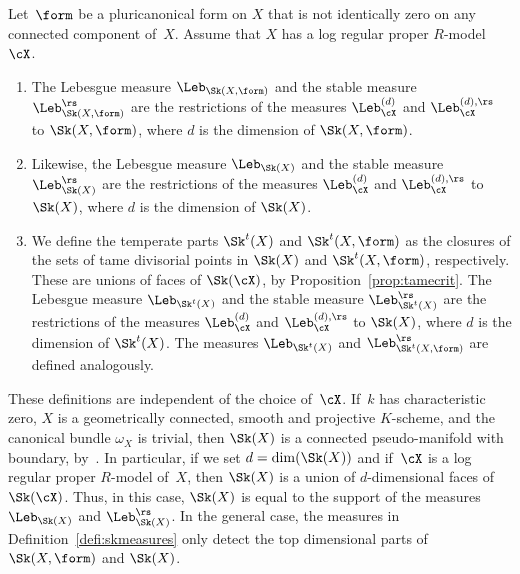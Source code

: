 \begin{definition}\label{defi:skmeasures}
Let~$\form$ be a pluricanonical form on $X$ that is not identically zero on any connected component of~$X$.
Assume that $X$ has a log regular proper $R$\nobreakdash-model~$\cX$.

\begin{enumerate}
\item The Lebesgue measure $\Leb_{\Sk(X,\form)}$ and the stable measure $\Leb^{\rs}_{\Sk(X,\form)}$ are
the restrictions of the measures $\Leb_{\cX}^{(d)}$ and $\Leb^{(d),\rs}_{\cX}$ to $\Sk(X,\form)$, where $d$ is the dimension of $\Sk(X,\form)$.

\item
Likewise, the Lebesgue measure $\Leb_{\Sk(X)}$ and the stable measure $\Leb^{\rs}_{\Sk(X)}$ are
the restrictions of the measures $\Leb_{\cX}^{(d)}$ and $\Leb^{(d),\rs}_{\cX}$ to $\Sk(X)$, where $d$ is the dimension of $\Sk(X)$.

\item We define the temperate parts $\Sk^t(X)$ and $\Sk^t(X,\form)$ as the closures of the sets of tame divisorial points in $\Sk(X)$ and $\Sk^t(X,\form)$, respectively. These are unions of faces of $\Sk(\cX)$, by Proposition~\ref{prop:tamecrit}.
The Lebesgue measure $\Leb_{\Sk^t(X)}$ and the stable measure $\Leb^{\rs}_{\Sk^t(X)}$ are
the restrictions of the measures $\Leb_{\cX}^{(d)}$ and $\Leb^{(d),\rs}_{\cX}$ to $\Sk(X)$, where $d$ is the dimension of $\Sk^t(X)$. The measures $\Leb_{\Sk^t(X)}$ and $\Leb^{\rs}_{\Sk^t(X,\form)}$ are defined analogously.
\end{enumerate}
\end{definition}
These definitions are independent of the choice of~$\cX$.
If~$k$ has characteristic zero, $X$ is a geometrically connected, smooth and projective $K$\nobreakdash-scheme, and the canonical bundle
$\omega_X$ is trivial, then $\Sk(X)$ is a connected pseudo-manifold with boundary, by~\cite[4.2.4]{NiXu}. In particular, if we set $d=\dim(\Sk(X))$ and if~$\cX$ is a log regular proper $R$\nobreakdash-model of~$X$, then $\Sk(X)$ is a union of $d$-dimensional faces of $\Sk(\cX)$. Thus, in this case, $\Sk(X)$ is equal to the support of the measures $\Leb_{\Sk(X)}$ and $\Leb^{\rs}_{\Sk(X)}$. In the general case, the measures in Definition~\ref{defi:skmeasures} only detect the top dimensional parts of $\Sk(X,\form)$ and $\Sk(X)$.

